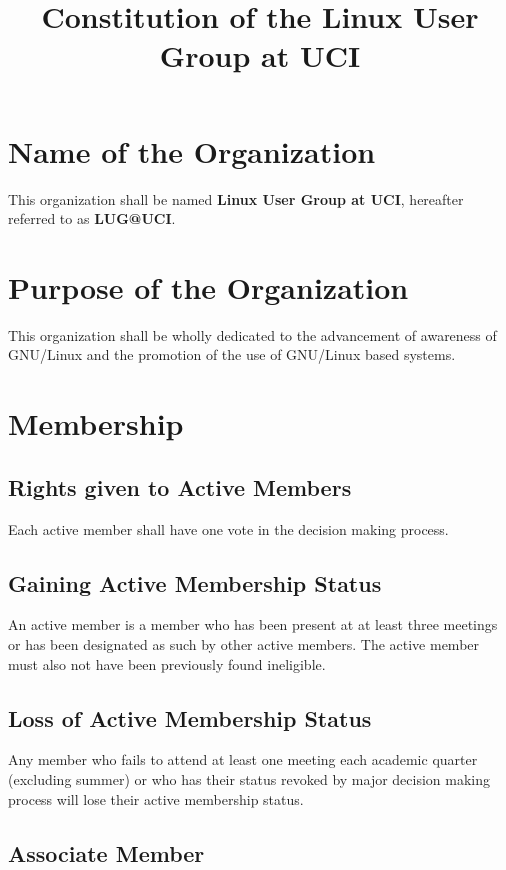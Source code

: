 \documentclass{article}
\title{Constitution of the Linux User Group at UCI}
\begin{document}
\maketitle

\section{Name of the Organization}

This organization shall be named \textbf{Linux User Group at UCI}, hereafter 
referred to as \textbf{LUG@UCI}.

\section{Purpose of the Organization}

This organization shall be wholly dedicated to the advancement of awareness of 
GNU/Linux and the promotion of the use of GNU/Linux based systems.

\section{Membership}

\subsection{Rights given to Active Members}

Each active member shall have one vote in the decision making process.

\subsection{Gaining Active Membership Status}

An active member is a member who has been present at at least three meetings or 
has been designated as such by other active members. The active member must also 
not have been previously found ineligible.

\subsection{Loss of Active Membership Status}

Any member who fails to attend at least one meeting each academic quarter 
(excluding summer) or who has their status revoked by major decision making 
process will lose their active membership status.

\subsection{Associate Member}
\end{document}

